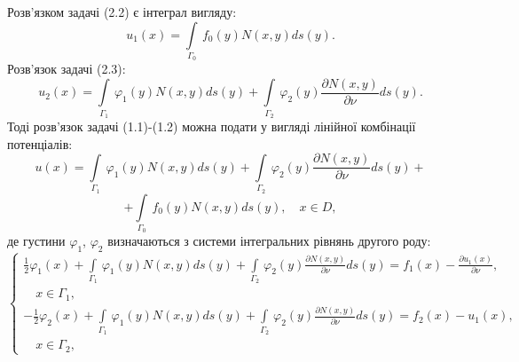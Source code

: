 \documentclass[a4 paper,12pt,ukrainian]{report}
\begin{document}
\hspace*{\parindent}Розв'язком задачі (2.2) є інтеграл вигляду:
\begin{equation}
u_{1}(x) = \int\limits_{\Gamma_{0}} \, f_{0}(y)N(x,y) ds(y). 
\end{equation}
\hspace*{\parindent}Розв'язок задачі (2.3):
\begin{equation}
u_{2}(x) = \int\limits_{\Gamma_{1}} \, \varphi_{1}(y)N(x,y)ds(y)+\int\limits_{\Gamma_{2}} \, \varphi_{2}(y)\frac{\partial N(x,y)}{\partial\nu}ds(y). 
\end{equation}
\hspace*{\parindent}Тоді розв'язок задачі (1.1)-(1.2) можна подати у вигляді лінійної комбінації потенціалів:
\begin{equation}
u(x) = \int\limits_{\Gamma_{1}} \, \varphi_{1}(y)N(x,y)ds(y)+\int\limits_{\Gamma_{2}} \, \varphi_{2}(y)\frac{\partial N(x,y)}{\partial\nu}ds(y)+
\end{equation}
\begin{equation*}
+\int\limits_{\Gamma_{0}} \, f_{0}(y)N(x,y) ds(y), \quad x \in D,
\end{equation*}
де густини $\varphi_{1}$, $\varphi_{2}$ визначаються з системи інтегральних рівнянь другого роду:
\begin{equation}\label{13}
 \left\{
\begin{array}{c}
   \displaystyle
\frac{1}{2}\varphi_{1}(x) + \int\limits_{\Gamma_1} \, \varphi_1(y)N(x,y)ds(y)+\int\limits_{\Gamma_2} \, \varphi_2(y)\frac{\partial N(x,y)}{\partial\nu}ds(y)=f_1(x)-\frac{\partial u_{1}(x)}{\partial\nu},\\ \quad x\in \Gamma_1,\\

	\displaystyle
  -\frac{1}{2}\varphi_{2}(x) + \int\limits_{\Gamma_1} \, \varphi_1(y)N(x,y)ds(y)+\int\limits_{\Gamma_2} \, \varphi_2(y)\frac{\partial N(x,y)}{\partial\nu}ds(y)=f_2(x)-u_{1}(x),\\ \quad x\in \Gamma_2,
 \end{array}
\right.
\end{equation}


\newpage
\end{document}
